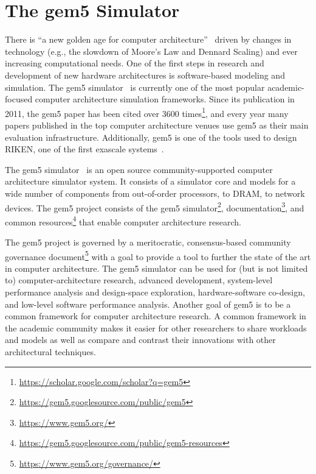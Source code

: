 \section{The gem5 Simulator}


There is ``a new golden age for computer architecture''~\cite{HennessyPatterson-turingLect-isca18, HennessyPatterson-CACM19} driven by changes in technology (e.g., the slowdown of Moore's Law and Dennard Scaling) and ever increasing computational needs.
One of the first steps in research and development of new hardware architectures is software-based modeling and simulation.
The gem5 simulator~\cite{Binkert-gem5-2011} is currently one of the most popular academic-focused computer architecture simulation frameworks.
Since its publication in 2011, the gem5 paper has been cited over 3600 times\footnote{\url{https://scholar.google.com/scholar?q=gem5}}, and every year many papers published in the top computer architecture venues use gem5 as their main evaluation infrastructure.
Additionally, gem5 is one of the tools used to design RIKEN, one of the first exascale systems~\cite{Kodama:Riken:2019}.

The gem5 simulator~\cite{Binkert-gem5-2011} is an open source community-supported computer architecture simulator system.
It consists of a simulator core and models for a wide number of components from out-of-order processors, to DRAM, to network devices.
The gem5 project consists of the gem5 simulator\footnote{\url{https://gem5.googlesource.com/public/gem5}}, documentation\footnote{\url{https://www.gem5.org/}}, and common resources\footnote{\url{https://gem5.googlesource.com/public/gem5-resources}} that enable computer architecture research.

The gem5 project is governed by a meritocratic, consensus-based community governance document\footnote{\url{https://www.gem5.org/governance/}} with a goal to provide a tool to further the state of the art in computer architecture.
The gem5 simulator can be used for (but is not limited to) computer-architecture research, advanced development, system-level performance analysis and design-space exploration, hardware-software co-design, and low-level software performance analysis.
Another goal of gem5 is to be a common framework for computer architecture research.
A common framework in the academic community makes it easier for other researchers to share workloads and models as well as compare and contrast their innovations with other architectural techniques.

